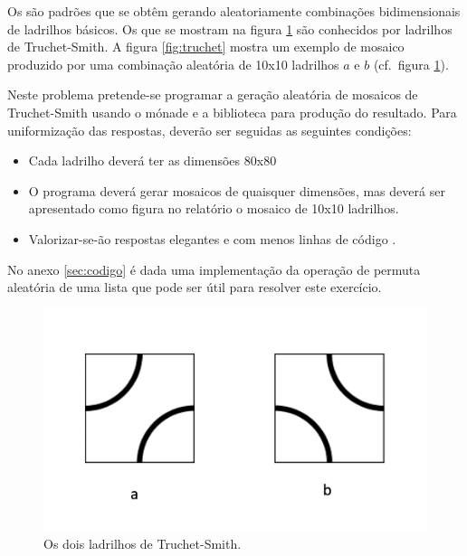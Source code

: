 \documentclass[a4paper]{article}
\newcommand{\Varid}[1]{\mathit{#1}}
\begin{document}
Os  são padrões que se obtêm gerando aleatoriamente
combinações bidimensionais de ladrilhos básicos. Os que se mostram na figura
\ref{fig:tiles} são conhecidos por ladrilhos de Truchet-Smith.
A figura \ref{fig:truchet} mostra um exemplo de mosaico produzido por uma
combinação aleatória de 10x10 ladrilhos \ensuremath{\Varid{a}} e \ensuremath{\Varid{b}} (cf.\ figura
\ref{fig:tiles}).

Neste problema pretende-se programar a geração aleatória de mosaicos de
Truchet-Smith usando o mónade  e a biblioteca 
para produção do resultado. Para uniformização das respostas, deverão ser
seguidas as seguintes condições:
\begin{itemize}
\item	Cada ladrilho deverá ter as dimensões 80x80
\item	O programa deverá gerar mosaicos de quaisquer dimensões, mas deverá ser apresentado como figura no relatório o mosaico de 10x10 ladrilhos.
\item	Valorizar-se-ão respostas elegantes e com menos linhas de código \Haskell.
\end{itemize} 
No anexo \ref{sec:codigo} é dada uma implementação da operação de permuta aleatória de uma lista que pode ser útil para resolver este exercício.

    \begin{figure}\centering
    \includegraphics[scale=0.20]{images/tiles.png}
    \caption{Os dois ladrilhos de Truchet-Smith.}
    \label{fig:tiles}
    \end{figure}
\end{document}
